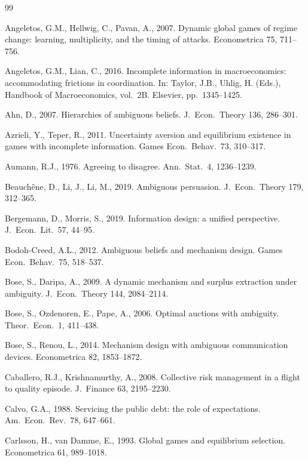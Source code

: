 \documentclass[12pt,a4paper]{article}
\theoremstyle{definition}
\theoremstyle{remark}
\begin{document}
\begin{thebibliography}{99}

Angeletos, G.M., Hellwig, C., Pavan, A., 2007. Dynamic global games of regime change: learning, multiplicity, and the timing of attacks. Econometrica 75, 711--756.

Angeletos, G.M., Lian, C., 2016. Incomplete information in macroeconomics: accommodating frictions in coordination. In: Taylor, J.B., Uhlig, H. (Eds.), Handbook of Macroeconomics, vol.\ 2B. Elsevier, pp.\ 1345--1425.

Ahn, D., 2007. Hierarchies of ambiguous beliefs. J.\ Econ.\ Theory 136, 286--301.

Azrieli, Y., Teper, R., 2011. Uncertainty aversion and equilibrium existence in games with incomplete information. Games Econ.\ Behav.\ 73, 310--317.

Aumann, R.J., 1976. Agreeing to disagree. Ann.\ Stat.\ 4, 1236--1239.

Beauch\^ene, D., Li, J., Li, M., 2019. Ambiguous persuasion. J.\ Econ.\ Theory 179, 312--365.

Bergemann, D., Morris, S., 2019. Information design: a unified perspective. J.\ Econ.\ Lit.\ 57, 44--95.

Bodoh-Creed, A.L., 2012. Ambiguous beliefs and mechanism design. Games Econ.\ Behav.\ 75, 518--537.

Bose, S., Daripa, A., 2009. A dynamic mechanism and surplus extraction under ambiguity. J.\ Econ.\ Theory 144, 2084--2114.

Bose, S., Ozdenoren, E., Pape, A., 2006. Optimal auctions with ambiguity. Theor.\ Econ.\ 1, 411--438.

Bose, S., Renou, L., 2014. Mechanism design with ambiguous communication devices. Econometrica 82, 1853--1872.

Caballero, R.J., Krishnamurthy, A., 2008. Collective risk management in a flight to quality episode. J.\ Finance 63, 2195--2230.

Calvo, G.A., 1988. Servicing the public debt: the role of expectations. Am.\ Econ.\ Rev.\ 78, 647--661.

Carlsson, H., van Damme, E., 1993. Global games and equilibrium selection. Econometrica 61, 989--1018.


\end{thebibliography}
\end{document}
